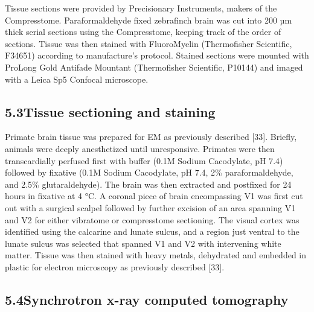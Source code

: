 \documentclass{article}
\begin{document}
Tissue sections were provided by Precisionary Instruments, makers of the Compresstome. Paraformaldehyde fixed zebrafinch brain was cut into 200 µm thick serial sections using the Compresstome, keeping track of the order of sections. Tissue was then stained with FluoroMyelin (Thermofisher Scientific, F34651) according to manufacture’s protocol. Stained sections were mounted with ProLong Gold Antifade Mountant (Thermofisher Scientific, P10144) and imaged with a Leica Sp5 Confocal microscope.


\subsection*{5.3\quad Tissue sectioning and staining}

Primate brain tissue was prepared for EM as previously described [33]. Briefly, animals were deeply anesthetized until unresponsive. Primates were then transcardially perfused first with buffer (0.1M Sodium Cacodylate, pH 7.4) followed by fixative (0.1M Sodium Cacodylate, pH 7.4, 2\% paraformaldehyde, and 2.5\% glutaraldehyde). The brain was then extracted and postfixed for 24 hours in fixative at 4 °C. A coronal piece of brain encompassing V1 was first cut out with a surgical scalpel followed by further excision of an area spanning V1 and V2 for either vibratome or compresstome sectioning. The visual cortex was identified using the calcarine and lunate sulcus, and a region just ventral to the lunate sulcus was selected that spanned V1 and V2 with intervening white matter. Tissue was then stained with heavy metals, dehydrated and embedded in plastic for electron microscopy as previously described [33].

\subsection*{5.4\quad Synchrotron x-ray computed tomography}
\end{document}
